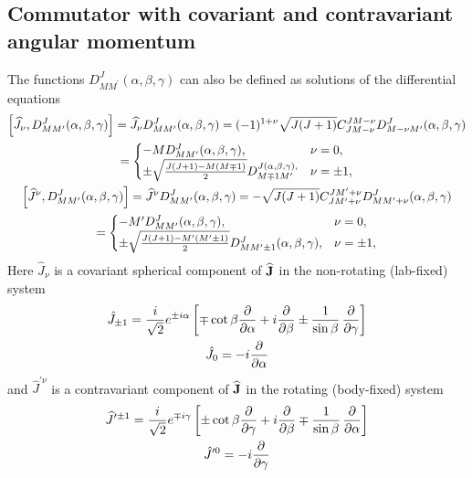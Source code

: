 \subsection{Commutator with covariant and contravariant angular momentum}
The functions $D_{M M^{\prime}}^{J}(\alpha, \beta, \gamma)$ can also be defined as solutions of the differential equations
\begin{gather}
{\left[\widehat{J}_{\nu}, D_{M M^{\prime}}^{J}(\alpha, \beta, \gamma)\right]=\widehat{J}_{\nu} D_{M M^{\prime}}^{J}(\alpha, \beta, \gamma)=(-1)^{1+\nu} \sqrt{J(J+1)} C_{J M-\nu}^{J M-\nu} D_{M-\nu M^{\prime}}^{J}(\alpha, \beta, \gamma)}  \notag\\
= \begin{cases}-M D_{M M^{\prime}}^{J}(\alpha, \beta, \gamma), & \nu=0 ,\\
\pm \sqrt{\frac{J(J+1)-M(M \mp 1)}{2}} D_{M \mp 1 M^{\prime}}^{J(\alpha, \beta, \gamma),} & \nu= \pm 1,\end{cases}  \label{eq:4:2:4}\\
{\left[\widehat{J}^{\nu}, D_{M M^{\prime}}^{J}(\alpha, \beta, \gamma)\right]=\widehat{J}^{\nu} D_{M M^{\prime}}^{J}(\alpha, \beta, \gamma)=-\sqrt{J(J+1)} C_{J M^{\prime}+\nu}^{J M^{\prime}+\nu} D_{M M^{\prime}+\nu}^{J}(\alpha, \beta, \gamma)}  \notag\\
= \begin{cases}-M^{\prime} D_{M M^{\prime}}^{J}(\alpha, \beta, \gamma), & \nu=0 ,\\
\pm \sqrt{\frac{J(J+1)-M^{\prime}\left(M^{\prime} \pm 1\right)}{2}} D_{M M^{\prime} \pm 1}^{J}(\alpha, \beta, \gamma), & \nu= \pm 1,\end{cases} \label{eq:4:2:5}
\end{gather}
Here $\hat{J}_{\nu}$ is a covariant spherical component of $\widehat{\mathbf{J}}$ in the non-rotating (lab-fixed) system
\begin{gather}
\hat{J}_{ \pm 1}=\frac{i}{\sqrt{2}} e^{ \pm i \alpha}\left[\mp \cot \beta \frac{\partial}{\partial \alpha}+i \frac{\partial}{\partial \beta} \pm \frac{1}{\sin \beta} \, \frac{\partial}{\partial \gamma}\right]  \label{eq:4:2:6}\\
\hat{J}_{0}=-i \frac{\partial}{\partial \alpha} \notag
\end{gather}
and $\widehat{J}^{\prime\nu}$ is a contravariant component of $\widehat{\mathbf{J}}$ in the rotating (body-fixed) system
\begin{gather}
\widehat{J}^{ \prime \pm 1}=\frac{i}{\sqrt{2}} e^{\mp i \gamma}\left[ \pm \cot \beta \frac{\partial}{\partial \gamma}+i \frac{\partial}{\partial \beta} \mp \frac{1}{\sin \beta} \, \frac{\partial}{\partial \alpha}\right]  \label{eq:4:2:7}\\
\hat{J}^{\prime 0}=-i \frac{\partial}{\partial \gamma} \notag
\end{gather}
